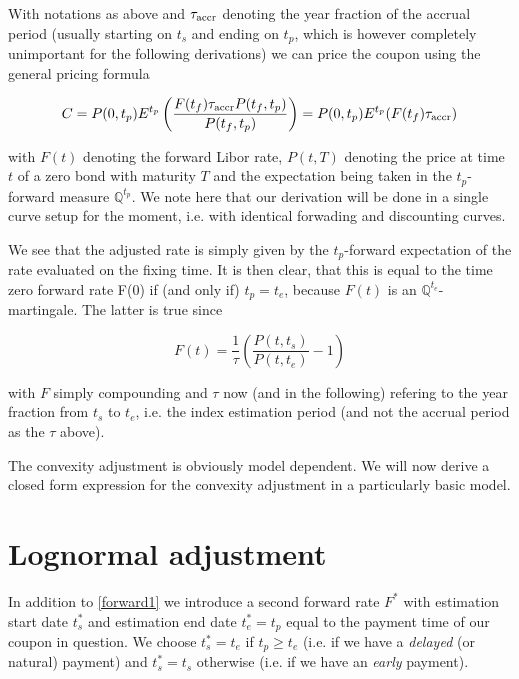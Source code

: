 \documentclass{amsart}
\theoremstyle{plain}
\numberwithin{equation}{section}
\begin{document}
With notations as above and $\tau_{\textnormal{accr}}$ denoting the year fraction of the accrual period (usually starting on $t_s$ and
ending on $t_p$, which is however completely unimportant for the following derivations) we can price the coupon using
the general pricing formula

\begin{equation}\label{generaladjustment}
C = P(0,t_p) E^{t_p} \left( \frac{F(t_f)\tau_{\textnormal{accr}} P(t_f,t_p)}{P(t_f,t_p)} \right) = P(0,t_p) E^{t_p} ( F(t_f) \tau_{\textnormal{accr}} )
\end{equation}

with $F(t)$ denoting the forward Libor rate, $P(t,T)$ denoting the price at time $t$ of a zero bond with maturity $T$
and the expectation being taken in the $t_p$-forward measure $\mathbb{Q}^{t_p}$. We note here that our derivation will be done in a single
curve setup for the moment, i.e. with identical forwading and discounting curves.

We see that the adjusted rate is simply given by the $t_p$-forward expectation of the rate evaluated on the fixing time. It is
then clear, that this is equal to the time zero forward rate F(0) if (and only if) $t_p = t_e$, because $F(t)$ is an $\mathbb{Q}^{t_e}$-martingale.
The latter is true since

\begin{equation}\label{forward1}
F(t) = \frac{1}{\tau} \left( \frac{P(t,t_s)}{P(t,t_e)} -1 \right)   
\end{equation}

with $F$ simply compounding and $\tau$ now (and in the following) refering to the year fraction from $t_s$ to $t_e$, i.e. the index estimation period (and not the accrual period as the $\tau$ above).

The convexity adjustment is obviously model dependent. We will now derive a closed
form expression for the convexity adjustment in a particularly basic model.

\section{Lognormal adjustment}

In addition to \ref{forward1} we introduce a second forward rate $F^*$ with estimation start date $t_s^*$ and estimation end
date $t_e^* = t_p$ equal to the payment time of our coupon in question. We choose $t_s^* = t_e$ if $t_p \geq t_e$ (i.e. if we have
a \textit{delayed} (or natural) payment) and $t_s^* = t_s$ otherwise (i.e. if we have an \textit{early} payment).
\end{document}
